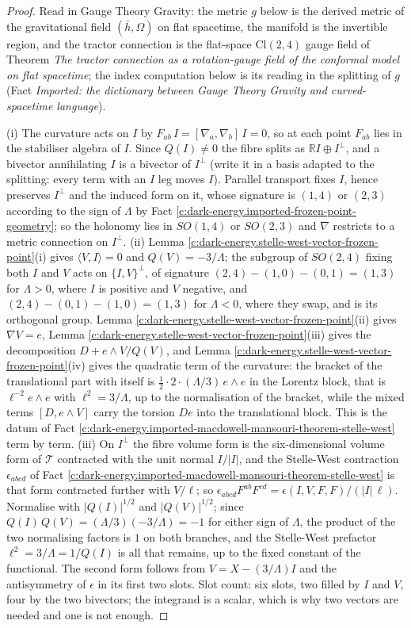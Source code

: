 \documentclass[11pt]{article}
\theoremstyle{definition}
\theoremstyle{plain}
\providecommand{\Cl}{}\renewcommand{\Cl}{\mathrm{Cl}}
\providecommand{\R}{}\renewcommand{\R}{\mathbb{R}}
\providecommand{\hb}{}\renewcommand{\hb}{\bar{h}}
\providecommand{\ip}{}\renewcommand{\ip}[2]{\langle #1, #2\rangle}
\begin{document}
\begin{proof}
Read in Gauge Theory Gravity: the metric $g$ below is the derived metric of the gravitational field $(\hb, \Omega)$ on flat spacetime, the manifold is the invertible region, and the tractor connection is the flat-space $\Cl(2,4)$ gauge field of Theorem \emph{The tractor connection as a rotation-gauge field of the conformal model on flat spacetime}; the index computation below is its reading in the splitting of $g$ (Fact \emph{Imported: the dictionary between Gauge Theory Gravity and curved-spacetime language}).

(i) The curvature acts on $I$ by $F_{ab}\,I = [\nabla_a, \nabla_b]\,I = 0$, so at each point $F_{ab}$ lies in the stabiliser algebra of $I$. Since $Q(I) \neq 0$ the fibre splits as $\R I \oplus I^\perp$, and a bivector annihilating $I$ is a bivector of $I^\perp$ (write it in a basis adapted to the splitting: every term with an $I$ leg moves $I$). Parallel transport fixes $I$, hence preserves $I^\perp$ and the induced form on it, whose signature is $(1,4)$ or $(2,3)$ according to the sign of $\Lambda$ by Fact \ref{c:dark-energy.imported-frozen-point-geometry}; so the holonomy lies in $SO(1,4)$ or $SO(2,3)$ and $\nabla$ restricts to a metric connection on $I^\perp$.
(ii) Lemma \ref{c:dark-energy.stelle-west-vector-frozen-point}(i) gives $\ip{V}{I} = 0$ and $Q(V) = -3/\Lambda$; the subgroup of $SO(2,4)$ fixing both $I$ and $V$ acts on $\{I,V\}^\perp$, of signature $(2,4) - (1,0) - (0,1) = (1,3)$ for $\Lambda > 0$, where $I$ is positive and $V$ negative, and $(2,4) - (0,1) - (1,0) = (1,3)$ for $\Lambda < 0$, where they swap, and is its orthogonal group. Lemma \ref{c:dark-energy.stelle-west-vector-frozen-point}(ii) gives $\nabla V = e$, Lemma \ref{c:dark-energy.stelle-west-vector-frozen-point}(iii) gives the decomposition $D + e\wedge V/Q(V)$, and Lemma \ref{c:dark-energy.stelle-west-vector-frozen-point}(iv) gives the quadratic term of the curvature: the bracket of the translational part with itself is $\tfrac12\cdot 2\cdot(\Lambda/3)\,e\wedge e$ in the Lorentz block, that is $\ell^{-2}e\wedge e$ with $\ell^2 = 3/\Lambda$, up to the normalisation of the bracket, while the mixed terms $[D, e\wedge V]$ carry the torsion $De$ into the translational block. This is the datum of Fact \ref{c:dark-energy.imported-macdowell-mansouri-theorem-stelle-west} term by term.
(iii) On $I^\perp$ the fibre volume form is the six-dimensional volume form of $\mathcal{T}$ contracted with the unit normal $I/|I|$, and the Stelle-West contraction $\epsilon_{abcd}$ of Fact \ref{c:dark-energy.imported-macdowell-mansouri-theorem-stelle-west} is that form contracted further with $V/\ell$; so $\epsilon_{abcd}F^{ab}F^{cd} = \epsilon(I, V, F, F)/(|I|\,\ell)$. Normalise with $|Q(I)|^{1/2}$ and $|Q(V)|^{1/2}$; since $Q(I)\,Q(V) = (\Lambda/3)(-3/\Lambda) = -1$ for either sign of $\Lambda$, the product of the two normalising factors is $1$ on both branches, and the Stelle-West prefactor $\ell^2 = 3/\Lambda = 1/Q(I)$ is all that remains, up to the fixed constant of the functional. The second form follows from $V = X - (3/\Lambda)I$ and the antisymmetry of $\epsilon$ in its first two slots. Slot count: six slots, two filled by $I$ and $V$, four by the two bivectors; the integrand is a scalar, which is why two vectors are needed and one is not enough.

\end{proof}
\end{document}
